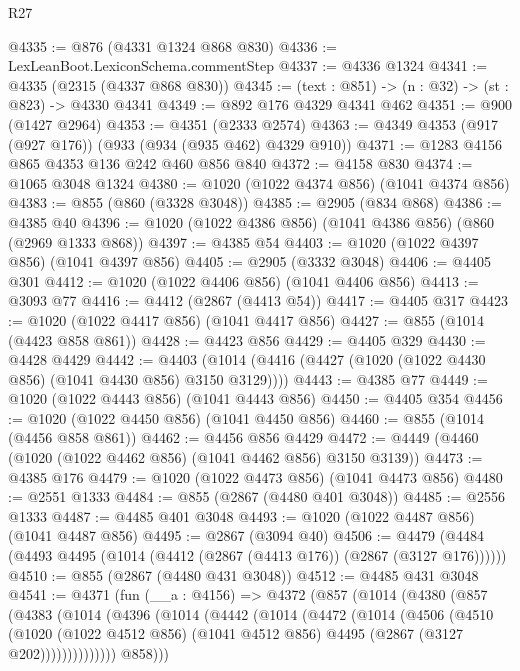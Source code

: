 \begin{lexlean}{R27}
\begin{coremodule}
@4335 := @876 (@4331 @1324 @868 @830)
@4336 := LexLeanBoot.LexiconSchema.commentStep
@4337 := @4336 @1324
@4341 := @4335 (@2315 (@4337 @868 @830))
@4345 := (text : @851) -> (n : @32) -> (st : @823) -> @4330 @4341
@4349 := @892 @176 @4329 @4341 @462
@4351 := @900 (@1427 @2964)
@4353 := @4351 (@2333 @2574)
@4363 := @4349 @4353 (@917 (@927 @176)) (@933 (@934 (@935 @462) @4329 @910))
@4371 := @1283 @4156 @865 @4353 @136 @242 @460 @856 @840
@4372 := @4158 @830
@4374 := @1065 @3048 @1324
@4380 := @1020 (@1022 @4374 @856) (@1041 @4374 @856)
@4383 := @855 (@860 (@3328 @3048))
@4385 := @2905 (@834 @868)
@4386 := @4385 @40
@4396 := @1020 (@1022 @4386 @856) (@1041 @4386 @856) (@860 (@2969 @1333 @868))
@4397 := @4385 @54
@4403 := @1020 (@1022 @4397 @856) (@1041 @4397 @856)
@4405 := @2905 (@3332 @3048)
@4406 := @4405 @301
@4412 := @1020 (@1022 @4406 @856) (@1041 @4406 @856)
@4413 := @3093 @77
@4416 := @4412 (@2867 (@4413 @54))
@4417 := @4405 @317
@4423 := @1020 (@1022 @4417 @856) (@1041 @4417 @856)
@4427 := @855 (@1014 (@4423 @858 @861))
@4428 := @4423 @856
@4429 := @4405 @329
@4430 := @4428 @4429
@4442 := @4403 (@1014 (@4416 (@4427 (@1020 (@1022 @4430 @856) (@1041 @4430 @856) @3150 @3129))))
@4443 := @4385 @77
@4449 := @1020 (@1022 @4443 @856) (@1041 @4443 @856)
@4450 := @4405 @354
@4456 := @1020 (@1022 @4450 @856) (@1041 @4450 @856)
@4460 := @855 (@1014 (@4456 @858 @861))
@4462 := @4456 @856 @4429
@4472 := @4449 (@4460 (@1020 (@1022 @4462 @856) (@1041 @4462 @856) @3150 @3139))
@4473 := @4385 @176
@4479 := @1020 (@1022 @4473 @856) (@1041 @4473 @856)
@4480 := @2551 @1333
@4484 := @855 (@2867 (@4480 @401 @3048))
@4485 := @2556 @1333
@4487 := @4485 @401 @3048
@4493 := @1020 (@1022 @4487 @856) (@1041 @4487 @856)
@4495 := @2867 (@3094 @40)
@4506 := @4479 (@4484 (@4493 @4495 (@1014 (@4412 (@2867 (@4413 @176)) (@2867 (@3127 @176))))))
@4510 := @855 (@2867 (@4480 @431 @3048))
@4512 := @4485 @431 @3048
@4541 := @4371
    (fun (__a : @4156) =>
    @4372
      (@857
        (@1014
          (@4380
            (@857
              (@4383
                (@1014
                  (@4396
                    (@1014
                      (@4442
                        (@1014
                          (@4472
                            (@1014
                              (@4506
                                (@4510
                                  (@1020
                                    (@1022 @4512 @856)
                                    (@1041 @4512 @856)
                                    @4495
                                    (@2867 (@3127 @202))))))))))))))
            @858)))

\end{coremodule}
\end{lexlean}
